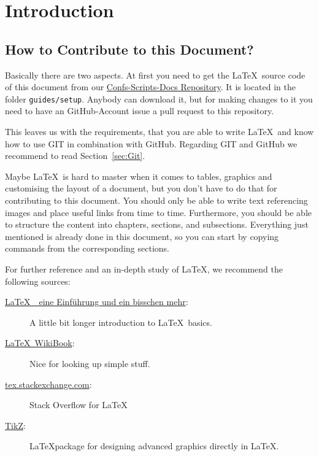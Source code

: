 \chapter{Introduction}
\label{chap:Introduction}

\section{How to Contribute to this Document?}
\label{sec:Contribute}

Basically there are two aspects. At first you need to get the \LaTeX\  source code of this document from our \href{https://github.com/stephanopfer/confs-scripts-docs.git}{Confs-Scripts-Docs Repository}. It is located in the folder \verb#guides/setup#. Anybody can download it, but for making changes to it you need to have an GitHub-Account issue a pull request to this repository.

This leaves us with the requirements, that you are able to write \LaTeX\ and know how to use GIT in combination with GitHub. Regarding GIT and GitHub we recommend to read Section~\ref{sec:Git}. 

Maybe \LaTeX\ is hard to master when it comes to tables, graphics and customising the layout of a document, but you don't have to do that for contributing to this document. You should only be able to write text referencing images and place useful links from time to time. Furthermore, you should be able to structure the content into chapters, sections, and subsections. Everything just mentioned is already done in this document, so you can start by copying commands from the corresponding sections. 

For further reference and an in-depth study of \LaTeX, we recommend the following sources:

\begin{description}
  \item[\href{http://www.wiwiss.fu-berlin.de/fachbereich/vwl/iso/links/latex_einfuehrung_manuela_juergens.pdf}{\LaTeX\ \textendash\ eine Einf\"uhrung und ein bisschen mehr}:] A little bit longer introduction to \LaTeX\ basics.
  \item[\href{https://en.wikibooks.org/wiki/LaTeX}{\LaTeX\ WikiBook}:] Nice for looking up simple stuff. 
  \item[\href{https://tex.stackexchange.com}{tex.stackexchange.com}:] Stack Overflow for \LaTeX
  \item[\href{http://ftp.fau.de/ctan/graphics/pgf/base/doc/pgfmanual.pdf}{TikZ}:] \LaTeX package for designing advanced graphics directly in \LaTeX.
\end{description}

